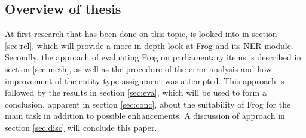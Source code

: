 \subsection{Overview of thesis}
At first research that has been done on this topic, is looked into in section \ref{sec:rel}, which will provide a more in-depth look at Frog and its NER module. Secondly, the approach of evaluating Frog on parliamentary items is described in section \ref{sec:meth}, as well as the procedure of the error analysis and how improvement of the entity type assignment was attempted. This approach is followed by the results in section \ref{sec:eva}, which will be used to form a conclusion, apparent in section \ref{sec:conc}, about the suitability of Frog for the main task in addition to possible enhancements. A discussion of approach in section \ref{sec:disc} will conclude this paper.
